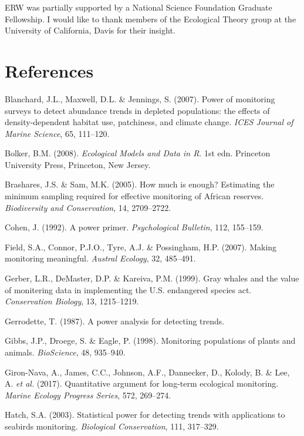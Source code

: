 \documentclass[12pt,]{article}
\begin{document}
ERW was partially supported by a National Science Foundation Graduate
Fellowship. I would like to thank members of the Ecological Theory group
at the University of California, Davis for their insight.

\section{References}\label{references}

\hypertarget{refs}{}
\hypertarget{ref-Blanchard2007}{}
Blanchard, J.L., Maxwell, D.L. \& Jennings, S. (2007). Power of
monitoring surveys to detect abundance trends in depleted populations:
the effects of density-dependent habitat use, patchiness, and climate
change. \emph{ICES Journal of Marine Science}, 65, 111--120.

\hypertarget{ref-Bolker2008}{}
Bolker, B.M. (2008). \emph{Ecological Models and Data in R}. 1st edn.
Princeton University Press, Princeton, New Jersey.

\hypertarget{ref-Brashares2005}{}
Brashares, J.S. \& Sam, M.K. (2005). How much is enough? Estimating the
minimum sampling required for effective monitoring of African reserves.
\emph{Biodiversity and Conservation}, 14, 2709--2722.

\hypertarget{ref-Cohen1992}{}
Cohen, J. (1992). A power primer. \emph{Psychological Bulletin}, 112,
155--159.

\hypertarget{ref-Field2007}{}
Field, S.A., Connor, P.J.O., Tyre, A.J. \& Possingham, H.P. (2007).
Making monitoring meaningful. \emph{Austral Ecology}, 32, 485--491.

\hypertarget{ref-Gerber1999}{}
Gerber, L.R., DeMaster, D.P. \& Kareiva, P.M. (1999). Gray whales and
the value of monitering data in implementing the U.S. endangered species
act. \emph{Conservation Biology}, 13, 1215--1219.

\hypertarget{ref-Gerrodette1987}{}
Gerrodette, T. (1987). A power analysis for detecting trends.

\hypertarget{ref-Gibbs1998}{}
Gibbs, J.P., Droege, S. \& Eagle, P. (1998). Monitoring populations of
plants and animals. \emph{BioScience}, 48, 935--940.

\hypertarget{ref-Giron-Nava2017}{}
Giron-Nava, A., James, C.C., Johnson, A.F., Dannecker, D., Kolody, B. \&
Lee, A. \emph{et al.} (2017). Quantitative argument for long-term
ecological monitoring. \emph{Marine Ecology Progress Series}, 572,
269--274.

\hypertarget{ref-Hatch2003}{}
Hatch, S.A. (2003). Statistical power for detecting trends with
applications to seabirds monitoring. \emph{Biological Conservation},
111, 317--329.
\end{document}
